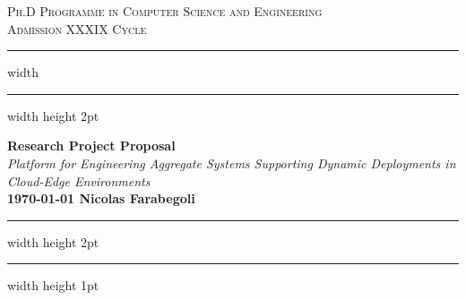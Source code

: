 \documentclass[12pt]{article}
\begin{document}
\begin{titlepage}
	\centering

	\textsc{\Large Ph.D Programme in Computer Science and Engineering}\\[0.5cm]
	\textsc{\Large Admission XXXIX Cycle}\\[0.6cm]

	\hrule width \hsize \kern 1mm \hrule width \hsize height 2pt
	\vspace{0.8cm}

	{\large \bfseries Research Project Proposal}\\[0.6cm]
	{\large \emph{Platform for Engineering Aggregate Systems Supporting Dynamic Deployments in Cloud-Edge Environments}}\\[0.6cm]

	{\bfseries{\monthyeardate\today} \hfill \bfseries{Nicolas Farabegoli}}\\[0.6cm]

	\hrule width \hsize height 2pt \kern 1mm \hrule width \hsize height 1pt
	\vspace{0.4cm}

	\begin{abstract}
		In recent years,
		the emergence of \ac{cps} has engendered a noteworthy surge in complexity and heterogeneity
		within the underlying infrastructure supporting these systems.
		Notably, the interplay between cloud, fog, and edge computing exemplifies the intricacy inherent in such systems.
		Modern collective adaptive applications like \ac{iot}, human enhanced by wearable devices,
		swarm robotics, smart cities,
		are designed to be executed on several devices and to be deployed in
		heterogeneous infrastructures, ranging from cloud servers to wearable devices.
		The availability of such a wide range of devices and infrastructures opens to
		better exploitation of the available resources and performance,
		but introduces complexity in the design and deployment of such applications.
		This research project proposes to produce a framework for the design and deployment of
		collective adaptive applications on heterogeneous infrastructures.
		Reconfiguration aspects will be considered,
		allowing the application to adapt to the changes in the infrastructure and external conditions.
		The framework will leverage machine learning techniques to manage the complex task of reconfiguration
		to opportunistically balance the performance and energy consumption.
		The framework will also offer modern approaches to make data avilable enabling data analysis;
		it becomes necessary because of the large amount of data produced by the \ac{iot} devices from extremely scattered data sources.
	\end{abstract}
\end{titlepage}
\end{document}
